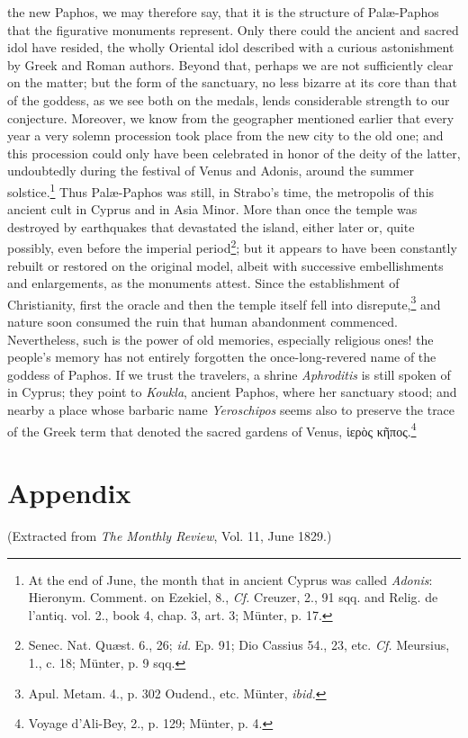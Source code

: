 \documentclass[a4paper, 11pt, oneside, polutonikogreek, english]{article}
\begin{document}
the new Paphos, we may therefore say, that it is the structure of Palæ-Paphos that the figurative monuments represent. Only there could the ancient and sacred idol have resided, the wholly Oriental idol described with a curious astonishment by Greek and Roman authors. Beyond that, perhaps we are not sufficiently clear on the matter; but the form of the sanctuary, no less bizarre at its core than that of the goddess, as we see both on the medals, lends considerable strength to our conjecture. Moreover, we know from the geographer mentioned earlier that every year a very solemn procession took place from the new city to the old one; and this procession could only have been celebrated in honor of the deity of the latter, undoubtedly during the festival of Venus and Adonis, around the summer solstice.\footnote{At the end of June, the month that in ancient Cyprus was called \emph{Adonis}: Hieronym. Comment. on Ezekiel, 8., \emph{Cf.} Creuzer, 2., 91 sqq. and Relig. de l'antiq. vol. 2., book 4, chap. 3, art. 3; Münter, p. 17.} Thus Palæ-Paphos was still, in Strabo's time, the metropolis of this ancient cult in Cyprus and in Asia Minor. More than once the temple was destroyed by earthquakes that devastated the island, either later or, quite possibly, even before the imperial period\footnote{Senec. Nat. Quæst. 6., 26; \emph{id.} Ep. 91; Dio Cassius 54., 23, etc. \emph{Cf.} Meursius, 1., c. 18; Münter, p. 9 sqq.}; but it appears to have been constantly rebuilt or restored on the original model, albeit with successive embellishments and enlargements, as the monuments attest. Since the establishment of Christianity, first the oracle and then the temple itself fell into disrepute,\footnote{Apul. Metam. 4., p. 302 Oudend., etc. Münter, \emph{ibid.}} and nature soon consumed the ruin that human abandonment commenced. Nevertheless, such is the power of old memories, especially religious ones! the people's memory has not entirely forgotten the once-long-revered name of the goddess of Paphos. If we trust the travelers, a shrine \emph{Aphroditis} is still spoken of in Cyprus; they point to \emph{Koukla}, ancient Paphos, where her sanctuary stood; and nearby a place whose barbaric name \emph{Yeroschipos} seems also to preserve the trace of the Greek term that denoted the sacred gardens of Venus, ἱερὸς κῆπος.\footnote{Voyage d'Ali-Bey, 2., p. 129; Münter, p. 4.}
\clearpage
\section{Appendix}
\begin{center}
(Extracted from \emph{The Monthly Review}, Vol. 11, June 1829.)
\end{center}
\end{document}
